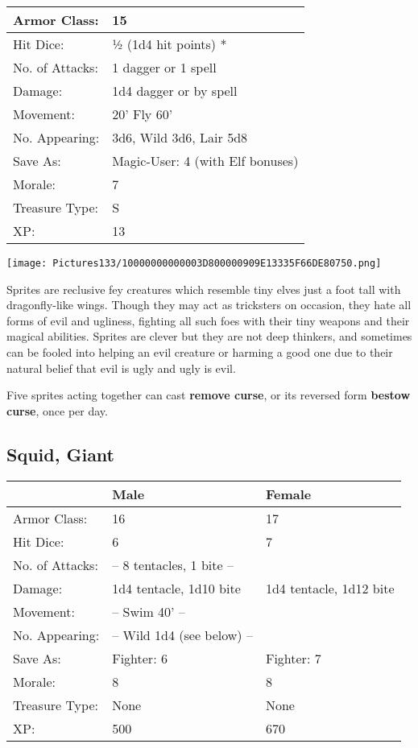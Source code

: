 \documentclass[a4paper,twoside,openany,10pt]{book}
\begin{document}
\begin{multicols}{2}
\begin{tabularx}{0.50\textwidth}{@{}lX@{}}
Armor Class: & 15 \\\hline
Hit Dice: & ½ (1d4 hit points) * \\\hline
No. of Attacks: & 1 dagger or 1 spell \\\hline
Damage: & 1d4 dagger or by spell \\\hline
Movement: & 20' Fly 60' \\\hline
No. Appearing: & 3d6, Wild 3d6, Lair 5d8 \\\hline
Save As: & Magic-User: 4 (with Elf bonuses) \\\hline
Morale: & 7 \\\hline
Treasure Type: & S \\\hline
XP: & 13 \\\hline
\end{tabularx}\medskip

\begin{center}
\texttt{[image: Pictures133/10000000000003D800000909E13335F66DE80750.png]}
\end{center}

Sprites are reclusive fey creatures which resemble tiny elves just a foot tall with dragonfly-like wings. Though they may act as tricksters on occasion, they hate all forms of evil and ugliness, fighting all such foes with their tiny weapons and their magical abilities. Sprites are clever but they are not deep thinkers, and sometimes can be fooled into helping an evil creature or harming a good one due to their natural belief that evil is ugly and ugly is evil. 

Five sprites acting together can cast \textbf{remove curse}, or its reversed form \textbf{bestow curse}, once per day.

\subsection*{Squid, Giant}\label{squid-giant}

\begin{tabularx}{0.50\textwidth}{@{}lXX@{}}
& Male & Female \\\hline
Armor Class: & 16 & 17 \\\hline
Hit Dice: & 6 & 7 \\\hline
No. of Attacks: & -- 8 tentacles, 1 bite -- & \\\hline
Damage: & 1d4 tentacle, 1d10 bite & 1d4 tentacle, 1d12 bite \\\hline
Movement: & -- Swim 40' -- & \\\hline
No. Appearing: & -- Wild 1d4 (see below) -- & \\\hline
Save As: & Fighter: 6 & Fighter: 7 \\\hline
Morale: & 8 & 8 \\\hline
Treasure Type: & None & None \\\hline
XP: & 500 & 670 \\\hline
\end{tabularx}\medskip


\end{multicols}
\end{document}
